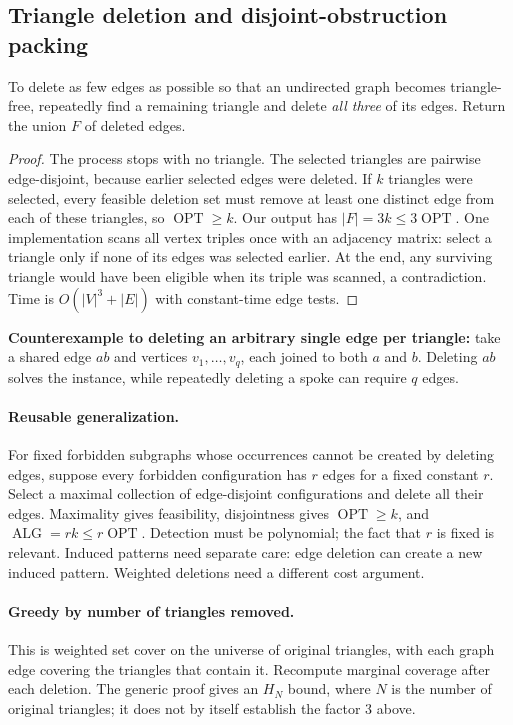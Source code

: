 \documentclass[10pt]{article}
\theoremstyle{definition}
\newcommand{\OPT}{\operatorname{OPT}}
\newcommand{\ALG}{\operatorname{ALG}}
\begin{document}
\subsection{Triangle deletion and disjoint-obstruction packing}
\label{gre:triangles}
To delete as few edges as possible so that an undirected graph becomes triangle-free,
repeatedly find a remaining triangle and delete \emph{all three} of its edges. Return the
union $F$ of deleted edges.
\begin{proof}
The process stops with no triangle. The selected triangles are pairwise edge-disjoint,
because earlier selected edges were deleted. If $k$ triangles were selected, every feasible
deletion set must remove at least one distinct edge from each of these triangles, so
$\OPT\ge k$. Our output has $|F|=3k\le3\OPT$.
One implementation scans all vertex triples once with an adjacency matrix: select a
triangle only if none of its edges was selected earlier. At the end, any surviving triangle
would have been eligible when its triple was scanned, a contradiction. Time is
$O(|V|^3+|E|)$ with constant-time edge tests.
\end{proof}
\textbf{Counterexample to deleting an arbitrary single edge per triangle:}
take a shared edge $ab$ and vertices $v_1,\ldots,v_q$, each joined to both $a$ and $b$.
Deleting $ab$ solves the instance, while repeatedly deleting a spoke can require $q$ edges.

\paragraph{Reusable generalization.}
For fixed forbidden subgraphs whose occurrences cannot be created by deleting edges,
suppose every forbidden configuration has $r$ edges for a fixed constant $r$. Select a maximal
collection of edge-disjoint configurations and delete all their edges. Maximality gives
feasibility, disjointness gives $\OPT\ge k$, and $\ALG=rk\le r\OPT$. Detection must be
polynomial; the fact that $r$ is fixed is relevant. Induced patterns need separate care:
edge deletion can create a new induced pattern. Weighted deletions need a different cost argument.

\paragraph{Greedy by number of triangles removed.}
This is weighted set cover on the universe of original triangles, with each graph edge
covering the triangles that contain it. Recompute marginal coverage after each deletion.
The generic proof gives an $H_N$ bound, where $N$ is the number of original triangles;
it does not by itself establish the factor 3 above.
\end{document}
